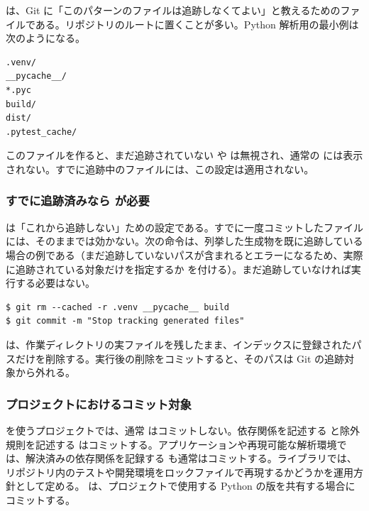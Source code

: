  は、Git に「このパターンのファイルは追跡しなくてよい」と教えるためのファイルである。リポジトリのルートに置くことが多い。Python 解析用の最小例は次のようになる。

\begin{lstlisting}[numbers=none, xleftmargin=2\zw, title={.gitignore}]
.venv/
__pycache__/
*.pyc
build/
dist/
.pytest_cache/
\end{lstlisting}

このファイルを作ると、まだ追跡されていない  や  は無視され、通常の  には表示されない。すでに追跡中のファイルには、この設定は適用されない。

\subsubsection{すでに追跡済みなら  が必要}

 は「これから追跡しない」ための設定である。すでに一度コミットしたファイルには、そのままでは効かない。次の命令は、列挙した生成物を既に追跡している場合の例である（まだ追跡していないパスが含まれるとエラーになるため、実際に追跡されている対象だけを指定するか  を付ける）。まだ追跡していなければ実行する必要はない。

\begin{lstlisting}[numbers=none, xleftmargin=2\zw]
$ git rm --cached -r .venv __pycache__ build
$ git commit -m "Stop tracking generated files"
\end{lstlisting}

 は、作業ディレクトリの実ファイルを残したまま、インデックスに登録されたパスだけを削除する。実行後の削除をコミットすると、そのパスは Git の追跡対象から外れる。

\subsubsection{ プロジェクトにおけるコミット対象}

 を使うプロジェクトでは、通常  はコミットしない。依存関係を記述する  と除外規則を記述する  はコミットする。アプリケーションや再現可能な解析環境では、解決済みの依存関係を記録する  も通常はコミットする。ライブラリでは、リポジトリ内のテストや開発環境をロックファイルで再現するかどうかを運用方針として定める。 は、プロジェクトで使用する Python の版を共有する場合にコミットする。


